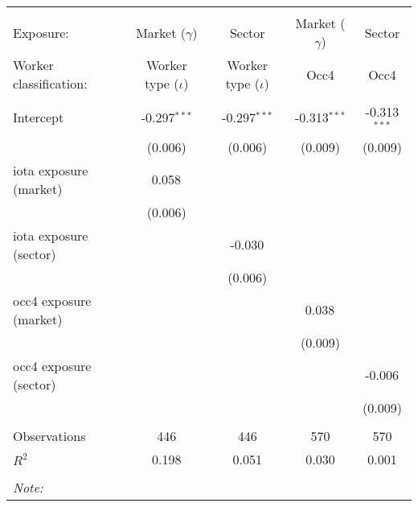 \begin{tabular}{@{\extracolsep{5pt}}lcccc}
\\[-1.8ex]\hline
\hline \\[-1.8ex]
\hline \\[-1.8ex]
 Exposure: & Market ($\gamma$) & Sector & Market ($\gamma$) & Sector \\
 Worker classification: & Worker type ($\iota$) & Worker type ($\iota$) & Occ4 & Occ4 \\
 \hline &  &  &  &  \\
 Intercept & -0.297$^{***}$ & -0.297$^{***}$ & -0.313$^{***}$ & -0.313$^{***}$ \\
& (0.006) & (0.006) & (0.009) & (0.009) \\
 iota exposure (market) & 0.058$^{}$ & & & \\
& (0.006) & & & \\
 iota exposure (sector) & & -0.030$^{}$ & & \\
& & (0.006) & & \\
 occ4 exposure (market) & & & 0.038$^{}$ & \\
& & & (0.009) & \\
 occ4 exposure (sector) & & & & -0.006$^{}$ \\
& & & & (0.009) \\
\hline \\[-1.8ex]
 Observations & 446 & 446 & 570 & 570 \\
 $R^2$ & 0.198 & 0.051 & 0.030 & 0.001 \\
\hline
\hline \\[-1.8ex]
\textit{Note:}\end{tabular}